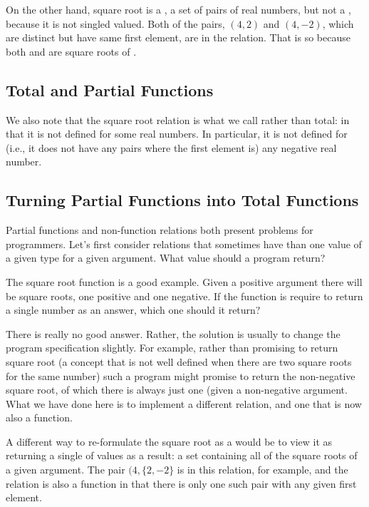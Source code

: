 \documentclass[letterpaper,10pt,english]{sphinxmanual}
\begin{document}
On the other hand, square root is a , a set of pairs of real
numbers, but not a , because it is not singled valued. Both
of the pairs, \((4,2)\) and \((4,-2)\), which are distinct but
have same first element, are in the relation. That is so because both
 and  are square roots of .


\subsection{Total and Partial Functions}
\label{\detokenize{05-verifying-logical-specifications:total-and-partial-functions}}
We also note that the square root relation  is
what we call  rather than total: in that it is not defined
for some real numbers. In particular, it is not defined for (i.e., it
does not have any pairs where the first element is) any negative real
number.


\subsection{Turning Partial Functions into Total Functions}
\label{\detokenize{05-verifying-logical-specifications:turning-partial-functions-into-total-functions}}
Partial functions and non-function relations both present problems for
programmers. Let’s first consider relations that sometimes have 
than one value of a given type for a given argument. What value should
a program return?

The square root function is a good example. Given a positive argument
there will be  square roots, one positive and one negative. If
the function is require to return a single number as an answer, which
one should it return?

There is really no good answer. Rather, the solution is usually to
change the program specification slightly. For example, rather than
promising to return  square root (a concept that is not well
defined when there are two square roots for the same number) such a
program might promise to return the non-negative square root, of which
there is always just one (given a non-negative argument. What we have
done here is to implement a different relation, and one that is now
also a function.

A different way to re-formulate the square root  as a
 would be to view it as returning a single  of values
as a result: a set containing all of the square roots of a given
argument.  The pair \((4, \{2, -2\}\) is in this relation, for
example, and the relation is also a function in that there is only one
such pair with any given first element.
\end{document}
